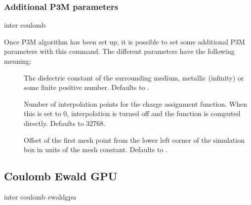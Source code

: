 \subsubsection{Additional P3M parameters}

\begin{essyntax}
  inter coulomb 
   
\end{essyntax}

Once P3M algorithm has been set up, it is possible to set some
additional P3M parameters with this command.  The different parameters
have the following meaning:
\begin{description}
\item[ ] The dielectric constant of the
  surrounding medium, metallic (\ie infinity) or some finite positive
  number.  Defaults to .
\item[ ] Number of interpolation
  points for the charge assignment function.  When this is set to $0$,
  interpolation is turned off and the function is computed directly.
  Defaults to $32768$.
\item[ ] Offset of the first mesh point
  from the lower left corner of the simulation box in units of the
  mesh constant. Defaults to .
\end{description}


\subsection{Coulomb Ewald GPU}
\label{sec:coulombewald}

\begin{essyntax}
  inter coulomb  ewaldgpu 
    
  \begin{features}
  \end{features}
\end{essyntax}

